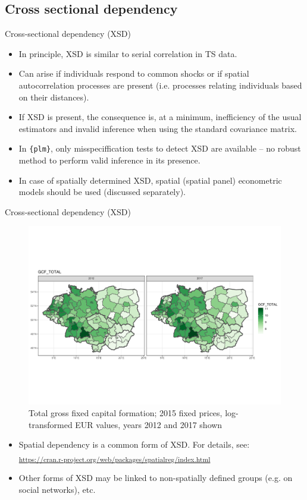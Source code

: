 \documentclass[usenames,dvipsnames]{beamer}
\begin{document}
\subsection*{Cross sectional dependency}
\begin{frame}{Cross-sectional dependency (XSD)}
\small
\begin{itemize}
    \item In principle, XSD is similar to serial correlation in TS data.
    \medskip
    \item Can arise if individuals respond to common shocks or if spatial autocorrelation processes are present (i.e. processes relating individuals based on their distances). 
    \medskip
    \item If XSD is present, the consequence is, at a minimum, inefficiency of the usual estimators and invalid inference when using the standard covariance matrix.
    \medskip
    \item In \texttt{\{plm\}}, only misspeciffication tests to detect XSD are available – no robust method to perform valid inference in its presence.
    \medskip
    \item In case of spatially determined XSD, spatial (spatial panel) econometric models should be used (discussed separately).
\end{itemize}
\end{frame}
\begin{frame}{Cross-sectional dependency (XSD)}
\small
\begin{figure}[htbp] 
\includegraphics[trim = 0cm 5cm 0cm 5.7cm, clip, width=1\textwidth]{img/GCF_total.pdf}
\caption{\small{Total gross fixed capital formation; 2015 fixed prices, log-transformed EUR values, years 2012 and 2017 shown}} \label{fig:choropleth2}
\end{figure}
\begin{itemize}
    \item Spatial dependency is a common form of XSD. For details, see:\\
    \textsubscript{ \textcolor{Blue}{\url{https://cran.r-project.org/web/packages/spatialreg/index.html}} }
    \medskip
    \item Other forms of XSD may be linked to non-spatially defined groups (e.g. on social networks), etc.
\end{itemize}
\end{frame}
\end{document}
